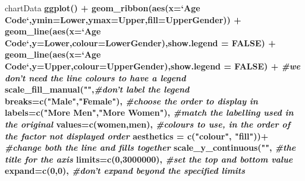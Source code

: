 \documentclass[]{article}
\newenvironment{Shaded}{\begin{snugshade}}{\end{snugshade}}
\newcommand{\KeywordTok}[1]{\textcolor[rgb]{0.13,0.29,0.53}{\textbf{#1}}}
\newcommand{\DataTypeTok}[1]{\textcolor[rgb]{0.13,0.29,0.53}{#1}}
\newcommand{\DecValTok}[1]{\textcolor[rgb]{0.00,0.00,0.81}{#1}}
\newcommand{\StringTok}[1]{\textcolor[rgb]{0.31,0.60,0.02}{#1}}
\newcommand{\CommentTok}[1]{\textcolor[rgb]{0.56,0.35,0.01}{\textit{#1}}}
\newcommand{\OtherTok}[1]{\textcolor[rgb]{0.56,0.35,0.01}{#1}}
\newcommand{\OperatorTok}[1]{\textcolor[rgb]{0.81,0.36,0.00}{\textbf{#1}}}
\newcommand{\NormalTok}[1]{#1}
\begin{document}
\begin{Shaded}
\begin{Highlighting}[]
\NormalTok{chartData }\OperatorTok{%>%}\StringTok{ }\KeywordTok{filter}\NormalTok{(Year}\OperatorTok{==}\DecValTok{2014}\NormalTok{) }\OperatorTok{%>%}
\StringTok{  }\KeywordTok{ggplot}\NormalTok{() }\OperatorTok{+}
\StringTok{  }\KeywordTok{geom_ribbon}\NormalTok{(}\KeywordTok{aes}\NormalTok{(}\DataTypeTok{x=}\StringTok{`}\DataTypeTok{Age Code}\StringTok{`}\NormalTok{,}\DataTypeTok{ymin=}\NormalTok{Lower,}\DataTypeTok{ymax=}\NormalTok{Upper,}\DataTypeTok{fill=}\NormalTok{UpperGender)) }\OperatorTok{+}
\StringTok{  }\KeywordTok{geom_line}\NormalTok{(}\KeywordTok{aes}\NormalTok{(}\DataTypeTok{x=}\StringTok{`}\DataTypeTok{Age Code}\StringTok{`}\NormalTok{,}\DataTypeTok{y=}\NormalTok{Lower,}\DataTypeTok{colour=}\NormalTok{LowerGender),}\DataTypeTok{show.legend =} \OtherTok{FALSE}\NormalTok{) }\OperatorTok{+}\StringTok{ }
\StringTok{  }\KeywordTok{geom_line}\NormalTok{(}\KeywordTok{aes}\NormalTok{(}\DataTypeTok{x=}\StringTok{`}\DataTypeTok{Age Code}\StringTok{`}\NormalTok{,}\DataTypeTok{y=}\NormalTok{Upper,}\DataTypeTok{colour=}\NormalTok{UpperGender),}\DataTypeTok{show.legend =} \OtherTok{FALSE}\NormalTok{) }\OperatorTok{+}\StringTok{ }\CommentTok{#we don't need the line colours to have a legend}
\StringTok{  }\KeywordTok{scale_fill_manual}\NormalTok{(}\StringTok{""}\NormalTok{,}\CommentTok{#don't label the legend}
                    \DataTypeTok{breaks=}\KeywordTok{c}\NormalTok{(}\StringTok{"Male"}\NormalTok{,}\StringTok{"Female"}\NormalTok{), }\CommentTok{#choose the order to display in }
                    \DataTypeTok{labels=}\KeywordTok{c}\NormalTok{(}\StringTok{"More Men"}\NormalTok{,}\StringTok{"More Women"}\NormalTok{), }\CommentTok{#match the labelling used in the original}
                    \DataTypeTok{values=}\KeywordTok{c}\NormalTok{(women,men), }\CommentTok{#colours to use, in the order of the factor not displayed order}
                    \DataTypeTok{aesthetics =} \KeywordTok{c}\NormalTok{(}\StringTok{"colour"}\NormalTok{, }\StringTok{"fill"}\NormalTok{))}\OperatorTok{+}\StringTok{ }\CommentTok{#change both the line and fills together}
\StringTok{  }\KeywordTok{scale_y_continuous}\NormalTok{(}\StringTok{""}\NormalTok{, }\CommentTok{#the title for the axis}
                     \DataTypeTok{limits=}\KeywordTok{c}\NormalTok{(}\DecValTok{0}\NormalTok{,}\DecValTok{3000000}\NormalTok{), }\CommentTok{#set the top and bottom value}
                     \DataTypeTok{expand=}\KeywordTok{c}\NormalTok{(}\DecValTok{0}\NormalTok{,}\DecValTok{0}\NormalTok{), }\CommentTok{#don't expand beyond the specified limits}
}
\end{Highlighting}
\end{Shaded}
\end{document}
